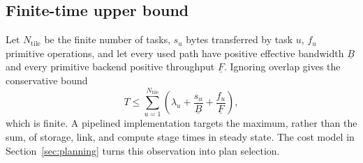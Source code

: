 \subsection{Finite-time upper bound}

Let $N_{\mathrm{tile}}$ be the finite number of tasks, $s_u$ bytes transferred by task $u$, $f_u$ primitive operations, and let every used path have positive effective bandwidth $\underline B$ and every primitive backend positive throughput $\underline F$. Ignoring overlap gives the conservative bound
\[
  T \le \sum_{u=1}^{N_{\mathrm{tile}}}
  \left(\lambda_u+\frac{s_u}{\underline B}+\frac{f_u}{\underline F}\right),
\]
which is finite. A pipelined implementation targets the maximum, rather than the sum, of storage, link, and compute stage times in steady state. The cost model in Section~\ref{sec:planning} turns this observation into plan selection.

